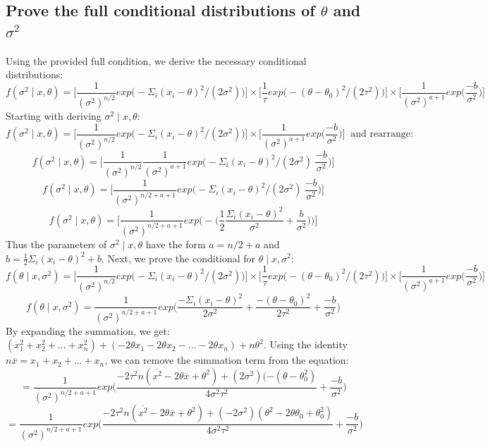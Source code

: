 \documentclass[20pt]{article} %
\begin{document}
\subsection{Prove the full conditional distributions of $\theta$ and $\sigma^{2}$}
Using the provided full condition, we derive the necessary conditional distributions:
$$f(\sigma^{2} \mid x, \theta) = \Bigg[ \frac{1}{(\sigma^{2})^{n/2}}exp\Bigg( -\Sigma_i (x_i - \theta)^{2} / (2\sigma^{2}) \Bigg) \Bigg] \times \Bigg[ \frac{1}{\tau} exp \Bigg( -(\theta - \theta_0)^{2} / (2\tau^{2}) \Bigg) \Bigg] \times \Bigg[ \frac{1}{(\sigma^{2})^{a+1}}exp\Bigg( \frac{-b}{\sigma^{2}} \Bigg) \Bigg]$$
Starting with deriving $\sigma^{2} \mid x, \theta$:
$$f(\sigma^{2} \mid x, \theta) = \Bigg[ \frac{1}{(\sigma^{2})^{n/2}}exp\Bigg( -\Sigma_i (x_i - \theta)^{2} / (2\sigma^{2}) \Bigg) \Bigg] \times \Bigg[ \frac{1}{(\sigma^{2})^{a+1}}exp\Bigg( \frac{-b}{\sigma^{2}} \Bigg) \Bigg] \ \text{ and rearrange:}$$
$$f(\sigma^{2} \mid x, \theta)= \Bigg[ \frac{1}{(\sigma^{2})^{n/2}} \frac{1}{(\sigma^{2})^{a+1}}exp\Bigg( -\Sigma_i (x_i - \theta)^{2} / (2\sigma^{2}) \ \frac{-b}{\sigma^{2}} \Bigg) \Bigg]$$
$$f(\sigma^{2} \mid x, \theta)= \Bigg[ \frac{1}{(\sigma^{2})^{n/2 + a + 1}} exp\Bigg( -\Sigma_i (x_i - \theta)^{2} / (2\sigma^{2}) \ \frac{-b}{\sigma^{2}} \Bigg) \Bigg]$$
$$f(\sigma^{2} \mid x, \theta)= \Bigg[ \frac{1}{(\sigma^{2})^{n/2 + a + 1}} exp\Bigg( - \Bigg( \frac{1}{2} \frac{\Sigma_i (x_i - \theta)^{2}}{\sigma^{2}} + \frac{b}{\sigma^{2}} \Bigg) \Bigg) \Bigg]$$
Thus the parameters of $\sigma^{2} \mid x, \theta$ have the form $a = n/2 + a$ and $b = \frac{1}{2} \Sigma_i (x_i - \theta)^{2} + b$. Next, we prove the conditional for $\theta \mid x, \sigma^{2}$:
$$f(\theta \mid x, \sigma^{2}) = \Bigg[ \frac{1}{(\sigma^{2})^{n/2}}exp\Bigg( -\Sigma_i (x_i - \theta)^{2} / (2\sigma^{2}) \Bigg) \Bigg] \times \Bigg[ \frac{1}{\tau} exp \Bigg( -(\theta - \theta_0)^{2} / (2\tau^{2}) \Bigg) \Bigg] \times \Bigg[ \frac{1}{(\sigma^{2})^{a+1}}exp\Bigg( \frac{-b}{\sigma^{2}} \Bigg) \Bigg]$$
$$f(\theta \mid x, \sigma^{2}) =  \frac{1}{(\sigma^{2})^{n/2 + a + 1}} exp \Bigg( \frac{-\Sigma_i (x_i - \theta)^{2}}{2\sigma^{2}} + \frac{-(\theta - \theta_0)^{2}}{2\tau^{2}}+\frac{-b}{\sigma^{2}} \Bigg)$$
By expanding the summation, we get: $(x_1^{2} + x_2^{2} + ... + x_n^{2}) + (-2\theta x_1 - 2\theta x_2 - ... - 2\theta x_n) + n\theta^{2}$.  Using the identity $n\overline{x} = x_1 + x_2 + ... + x_n$, we can remove the summation term from the equation:
$$=  \frac{1}{(\sigma^{2})^{n/2 + a + 1}} exp \Bigg( \frac{-2 \tau^{2} n ( \overline{x^{2}} - 2\theta \overline{x} + \theta^{2} ) + (2\sigma^{2})(-(\theta-\theta_0^{2})}{4\sigma^{2}\tau^{2}} + \frac{-b}{\sigma^{2}} \Bigg)$$
$$=  \frac{1}{(\sigma^{2})^{n/2 + a + 1}} exp \Bigg( \frac{-2 \tau^{2} n ( \overline{x^{2}} - 2\theta \overline{x} + \theta^{2} ) + (-2\sigma^{2})( \theta^{2}-2\theta \theta_0+\theta_0^{2} )}{4\sigma^{2}\tau^{2}} + \frac{-b}{\sigma^{2}} \Bigg)$$
\end{document}
